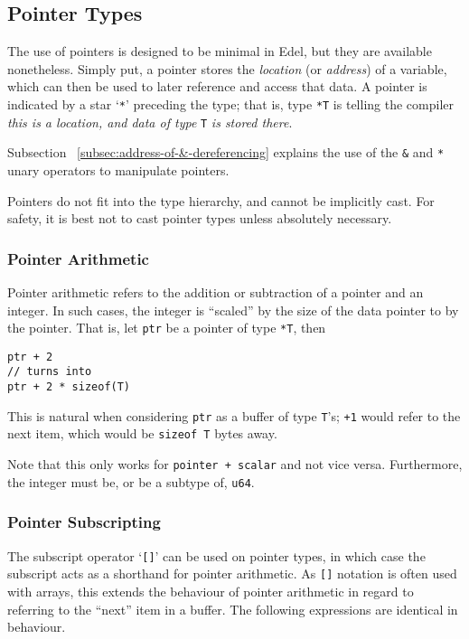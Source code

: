 \subsection{Pointer Types}\label{subsec:pointer-types}

The use of pointers is designed to be minimal in Edel, but they are available nonetheless.
Simply put, a pointer stores the \textit{location} (or \textit{address}) of a variable, which can then be used to later reference and access that data.
A pointer is indicated by a star `\texttt{*}' preceding the type;
that is, type \texttt{*T} is telling the compiler \textit{this is a location, and data of type } \texttt{T} \textit{is stored there}.

Subsection ~\ref{subsec:address-of-&-dereferencing} explains the use of the \texttt{\&} and \texttt{*} unary operators to manipulate pointers.

Pointers do not fit into the type hierarchy, and cannot be implicitly cast.
For safety, it is best not to cast pointer types unless absolutely necessary.

\subsubsection{Pointer Arithmetic}

Pointer arithmetic refers to the addition or subtraction of a pointer and an integer.
In such cases, the integer is ``scaled'' by the size of the data pointer to by the pointer.
That is, let \texttt{ptr} be a pointer of type \texttt{*T}, then

\begin{lstlisting}[language=CustomLang]
ptr + 2
// turns into
ptr + 2 * sizeof(T)
\end{lstlisting}

This is natural when considering \texttt{ptr} as a buffer of type \texttt{T}'s;
\texttt{+1} would refer to the next item, which would be \texttt{sizeof T} bytes away.

Note that this only works for \texttt{pointer + scalar} and not vice versa.
Furthermore, the integer must be, or be a subtype of, \texttt{u64}.

\subsubsection{Pointer Subscripting}

The subscript operator `\texttt{[]}' can be used on pointer types, in which case the subscript acts as a shorthand for pointer arithmetic.
As \texttt{[]} notation is often used with arrays, this extends the behaviour of pointer arithmetic in regard to referring to the ``next'' item in a buffer.
The following expressions are identical in behaviour.

